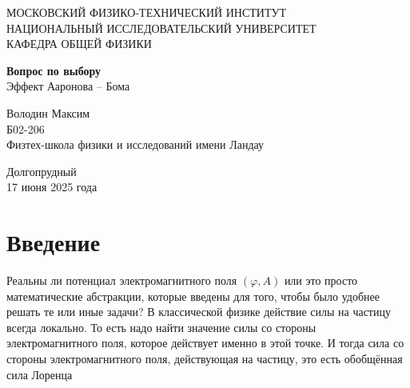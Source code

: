 \documentclass[a4paper, 14pt]{article}
\begin{document}
    \begin{titlepage}
        \begin{center}
        {\large МОСКОВСКИЙ ФИЗИКО-ТЕХНИЧЕСКИЙ ИНСТИТУТ \\ \vspace{5mm}
        НАЦИОНАЛЬНЫЙ ИССЛЕДОВАТЕЛЬСКИЙ УНИВЕРСИТЕТ \\ \vspace{5mm}
        КАФЕДРА ОБЩЕЙ ФИЗИКИ}
        \end{center}
        
        \begin{center}
        {\large}
        \end{center}
        
        \vspace{5cm}
        
        {\huge
            \begin{center}
                \textbf{Вопрос по выбору}
                \\ Эффект Ааронова -- Бома
            \end{center}
        }
        
        \vspace{2cm}
        
        \begin{flushright}
        {
            Володин Максим \\
            \vspace{2mm}
            Б02-206 \\
            \vspace{2mm}
            Физтех-школа физики и исследований имени Ландау
        }
        \end{flushright}
        
        \tableofcontents \vspace{4cm}
        
        \begin{center}
            Долгопрудный \\
            17 июня 2025 года
        \end{center}
    
    \end{titlepage}
    
    \section*{Введение} 
    
    Реальны ли потенциал электромагнитного поля $(\varphi, A)$ или это просто математические абстракции, которые
    введены для того, чтобы было удобнее решать те или иные задачи?
    В классической физике действие силы на частицу всегда локально.
    То есть надо найти значение силы со стороны электромагнитного поля, которое действует именно в этой точке.
    И тогда сила со стороны электромагнитного поля, действующая на частицу, это есть обобщённая сила Лоренца
    
\end{document}
